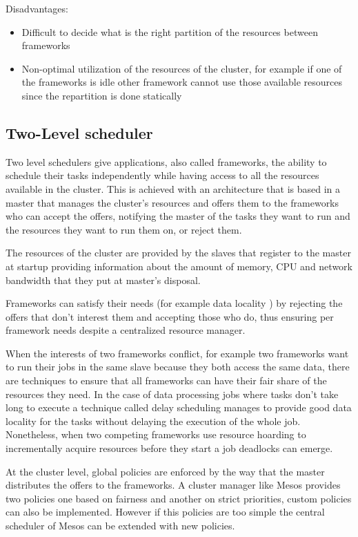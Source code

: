 \documentclass{svjour3}                     %
\begin{document}
Disadvantages:

\begin{itemize}
  \item Difficult to decide what is the right partition of the resources
between frameworks
  \item Non-optimal utilization of the resources of the cluster, for example
if one of the frameworks is idle other framework cannot use those
available resources since the repartition is done statically
\end{itemize}

\subsection{Two-Level scheduler}

Two level schedulers give applications, also called
frameworks, the ability to schedule their tasks independently while
having access to all the resources available in the cluster. This
is achieved with an architecture that is based in a master that manages
the cluster's resources and offers them to the frameworks who can accept 
the offers, notifying the master of the tasks they want to run and the
resources they want to run them on, or reject them.

The resources of the cluster are provided by the slaves that register to 
the master at startup providing information about the amount of memory, CPU
and network bandwidth  that they put at master's disposal.  

Frameworks can satisfy their needs (for example data locality \cite{chung_maximizing_2006} ) by 
rejecting the offers that don't interest them and accepting those who do, thus
ensuring per framework needs despite a centralized resource manager. 

When the interests of two frameworks conflict, for example two
frameworks want to run their jobs in the same slave because they both
access the same data, there are techniques to ensure that all
frameworks can have their fair share of the resources they need. In
the case of data processing jobs where tasks don't take long to
execute a technique called delay scheduling \cite{zaharia_delay_2010}
manages to provide good data locality for the tasks without delaying
the execution of the whole job. Nonetheless, when two competing
frameworks use resource hoarding to incrementally acquire resources
before they start a job deadlocks can emerge.

At the cluster level, global policies are enforced by the way that the
master distributes the offers to the frameworks. A cluster manager
like Mesos \cite{Hindman10mesos:a} provides two policies one based on
fairness \cite{AjtaiANRSW1998} and another on strict priorities,
custom policies can also be implemented. However if this policies are
too simple the central scheduler of Mesos can be extended with new
policies.
\end{document}
